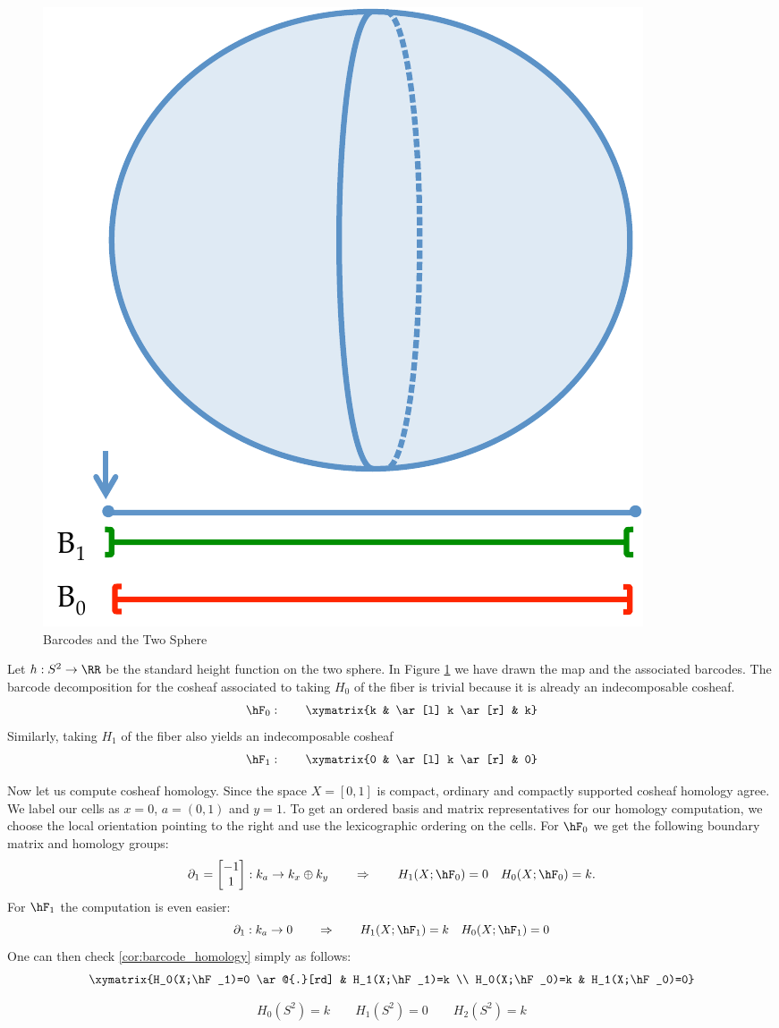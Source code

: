 \begin{ex}

\begin{figure}
\begin{center}
\includegraphics[width=.7\textwidth]{sphere_bc.pdf}
\end{center}
\caption{Barcodes and the Two Sphere}
\label{fig:sphere_bc}
\end{figure}

Let $h:S^2\to\RR$ be the standard height function on the two sphere. In Figure \ref{fig:sphere_bc} we have drawn the map and the associated barcodes. The barcode decomposition for the cosheaf associated to taking $H_0$ of the fiber is trivial because it is already an indecomposable cosheaf.
\[
	\hF_0: \qquad \xymatrix{k & \ar[l] k \ar[r] & k}
\]
Similarly, taking $H_1$ of the fiber also yields an indecomposable cosheaf
\[
	\hF_1: \qquad \xymatrix{0 & \ar[l] k \ar[r] & 0}
\]

Now let us compute cosheaf homology. Since the space $X=[0,1]$ is compact, ordinary and compactly supported cosheaf homology agree. We label our cells as $x=0$, $a=(0,1)$ and $y=1$. To get an ordered basis and matrix representatives for our homology computation, we choose the local orientation pointing to the right and use the lexicographic ordering on the cells. For $\hF_0$ we get the following boundary matrix and homology groups:
\[
  \partial_1=\begin{bmatrix}-1 \\ 1\end{bmatrix} : k_a \to k_x\oplus k_y \qquad \Rightarrow \qquad H_1(X;\hF_0)=0 \quad H_0(X;\hF_0)=k.
\]
For $\hF_1$ the computation is even easier:
\[
  \partial_1: k_a \to 0 \qquad \Rightarrow \qquad H_1(X;\hF_1)=k \quad H_0(X;\hF_1)=0
\]
One can then check \ref{cor:barcode_homology} simply as follows:
\[
\xymatrix{H_0(X;\hF_1)=0 \ar@{.}[rd] & H_1(X;\hF_1)=k \\
H_0(X;\hF_0)=k & H_1(X;\hF_0)=0}
\]

\[
H_0(S^2)=k \qquad H_1(S^2)=0 \qquad H_2(S^2)=k
\]
\end{ex}

